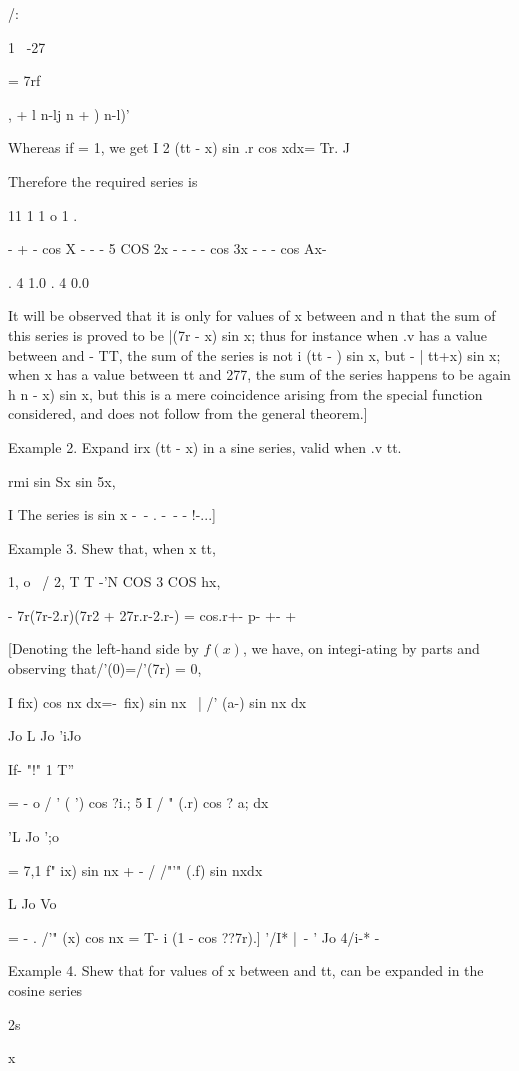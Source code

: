 /:

1 \ -27

= 7rf

, + l n-lj n + ) n-l)'

Whereas if = 1, we get I 2 (tt - x) sin .r cos xdx= Tr. J

Therefore the required series is

11 1 1 o 1 .

- + - cos X - - - 5 COS 2x - - - - cos 3x - - - cos Ax-

. 4 1.0 . 4 0.0

It will be observed that it is only for values of x between and n that
the sum of this series is proved to be |(7r - x) sin x; thus for
instance when .v has a value between and - TT, the sum of the series
is not i (tt - ) sin x, but - | tt+x) sin x; when x has a value
between tt and 277, the sum of the series happens to be again h n - x)
sin x, but this is a mere coincidence arising from the special
function considered, and does not follow from the general theorem.]

Example 2. Expand irx (tt - x) in a sine series, valid when .v tt.

rmi  sin Sx sin 5x,

I The series is sin x -\ - . -\ - - !-...]

%
%

Example 3. Shew that, when x tt,

1, o \ / 2, T T -'N COS 3 COS hx,

- 7r(7r-2.r)(7r2 + 27r.r-2.r-) = cos.r+- p- +- +

[Denoting the left-hand side by $f(x)$, we have, on integi-ating by
parts and observing that/'(0)=/'(7r) = 0,

I fix) cos nx dx=-\ fix) sin nx \ | /' (a-) sin nx dx

Jo L Jo 'iJo

If- "!" 1 T''

= - o / ' ( ') cos ?i.; 5 I / " (.r) cos ? a; dx

 'L Jo ';o

= 7,1 f" ix) sin nx + - / /"'" (.f) sin nxdx

  L Jo Vo

= - . /'" (x) cos nx = T- i (1 - cos ??7r).] '/I* |\ - ' Jo 4/i-* -

Example 4. Shew that for values of x between and tt, can be expanded
in the cosine series

2s

 x

